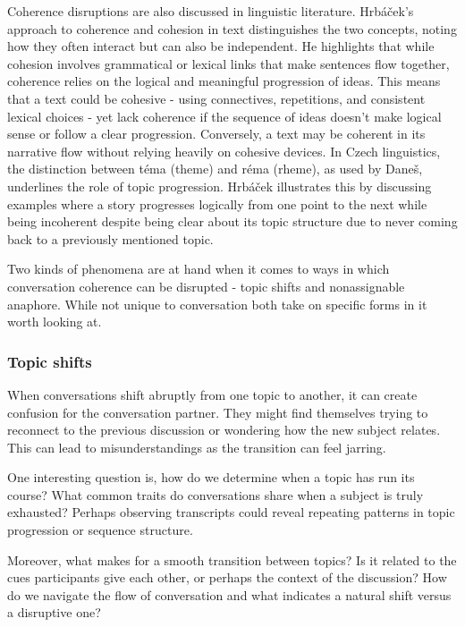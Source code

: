 \documentclass[12pt]{report}
\begin{document}
{\par
Coherence disruptions are also discussed in linguistic literature.
Hrbáček’s approach to coherence and cohesion in text distinguishes the two concepts,
noting how they often interact but can also be independent.
He highlights that while
cohesion involves grammatical or lexical links that
make sentences flow together,
coherence relies on the logical and meaningful progression of ideas.
This means that a text could be cohesive -
using connectives, repetitions, and consistent lexical choices -
yet lack coherence if the sequence of ideas doesn’t
make logical sense or follow a clear progression.
Conversely, a text may be coherent in its narrative flow without
relying heavily on cohesive devices.
In Czech linguistics,
the distinction between téma (theme) and réma (rheme), as used by Daneš,
underlines the role of topic progression.
Hrbáček illustrates this by discussing examples where
a story progresses logically from one point to the next while
being incoherent despite being clear about its topic structure
due to never coming back to a previously mentioned topic.

\par
Two kinds of phenomena are at hand when it comes to
ways in which conversation coherence can be disrupted -
topic shifts and nonassignable anaphore.
While not unique to conversation
both take on specific forms in it worth looking at.

\subsubsection{Topic shifts}
\par
    When conversations shift abruptly from one topic to another,
    it can create confusion for the conversation partner.
    They might find themselves trying to
    reconnect to the previous discussion or
    wondering how the new subject relates.
    This can lead to misunderstandings
    as the transition can feel jarring.

\par
    One interesting question is,
    how do we determine when a topic has run its course?
    What common traits do conversations share when a subject is truly exhausted?
    Perhaps observing transcripts could reveal repeating patterns in topic progression or sequence structure.

\par
    Moreover, what makes for a smooth transition between topics?
    Is it related to the cues participants give each other,
    or perhaps the context of the discussion?
    How do we navigate the flow of conversation and
    what indicates a natural shift versus a disruptive one?

}
\end{document}
